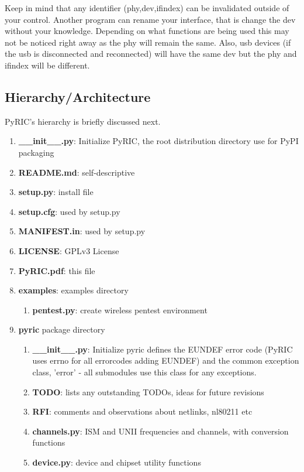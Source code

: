 \documentclass[11pt]{article}
\begin{document}
Keep in mind that any identifier (phy,dev,ifindex) can be invalidated outside of 
your control. Another program can rename your interface, that is change the dev 
without your knowledge. Depending on what functions are being used this may not 
be noticed right away as the phy will remain the same. Also, usb devices (if the 
usb is disconnected and reconnected) will have the same dev but the phy and 
ifindex will be different.

\subsection{Hierarchy/Architecture}
PyRIC's hierarchy is briefly discussed next.

\begin{enumerate}
\item \textbf{\_\_init\_\_.py}: Initialize PyRIC, the root distribution directory
use for PyPI packaging 
\item \textbf{README.md}: self-descriptive
\item \textbf{setup.py}: install file
\item \textbf{setup.cfg}: used by setup.py
\item \textbf{MANIFEST.in}: used by setup.py
\item \textbf{LICENSE}: GPLv3 License
\item \textbf{PyRIC.pdf}: this file
\item \textbf{examples}: examples directory
\begin{enumerate}
\item \textbf{pentest.py}: create wireless pentest environment
\end{enumerate}
\item \textbf{pyric} package directory
\begin{enumerate}
\item \textbf{\_\_init\_\_.py}: Initialize pyric defines the EUNDEF error code 
(PyRIC uses errno for all errorcodes adding EUNDEF) and the common exception 
class, 'error' - all submodules use this class for any exceptions.  
\item \textbf{TODO}: lists any outstanding TODOs, ideas for future revisions
\item \textbf{RFI}: comments and observations about netlinks, nl80211 etc
\item \textbf{channels.py}: ISM and UNII frequencies and channels, with conversion functions
\item \textbf{device.py}: device and chipset utility functions

\end{enumerate}
\end{enumerate}
\end{document}
